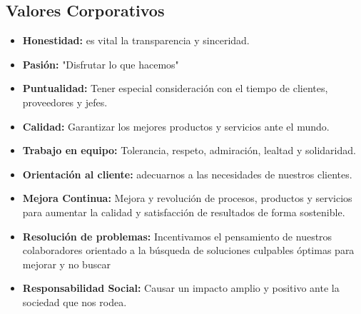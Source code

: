 \subsection{Valores Corporativos}
\begin{itemize}
  \item \textbf{Honestidad:}  es vital la transparencia y sinceridad.
  \item \textbf{Pasión:} "Disfrutar lo que hacemos"
  \item \textbf{Puntualidad:} Tener especial consideración con el tiempo de clientes, proveedores y jefes.
  \item \textbf{Calidad:} Garantizar los mejores productos y servicios ante el mundo.
  \item \textbf{Trabajo en equipo:} Tolerancia, respeto, admiración, lealtad y solidaridad.
  \item \textbf{Orientación al cliente:} adecuarnos a las necesidades de nuestros clientes.
  \item \textbf{Mejora Continua:} Mejora y revolución de procesos, productos y servicios para aumentar la calidad y satisfacción de resultados de forma sostenible.
  \item \textbf{Resolución de problemas:} Incentivamos el pensamiento de nuestros colaboradores orientado a la búsqueda de soluciones culpables óptimas para mejorar y no buscar
  \item \textbf{Responsabilidad Social:} Causar un impacto amplio y positivo ante la sociedad que nos rodea.
\end{itemize}

